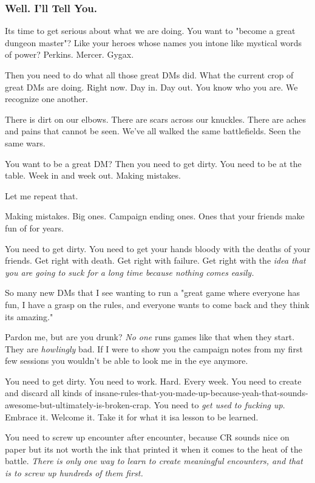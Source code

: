 \subsubsection{Well. I'll Tell You.}
Its time to get serious about what we are doing. You want to "become a great dungeon master"? Like your heroes whose names you intone like mystical words of power? Perkins. Mercer. Gygax.

Then you need to do what all those great DMs did. What the current crop of great DMs are doing. Right now. Day in. Day out. You know who you are. We recognize one another.

There is dirt on our elbows. There are scars across our knuckles. There are aches and pains that cannot be seen. We've all walked the same battlefields. Seen the same wars.

You want to be a great DM? Then you need to get dirty. You need to be at the table. Week in and week out. Making mistakes.

Let me repeat that.

Making mistakes. Big ones. Campaign ending ones. Ones that your friends make fun of for years.

You need to get dirty. You need to get your hands bloody with the deaths of your friends. Get right with death. Get right with failure. Get right with the \emph{idea that you are going to suck for a long time because nothing comes easily.}

So many new DMs that I see wanting to run a "great game where everyone has fun, I have a grasp on the rules, and everyone wants to come back and they think its amazing."

Pardon me, but are you drunk? \emph{No one} runs games like that when they start. They are \emph{howlingly} bad. If I were to show you the campaign notes from my first few sessions you wouldn't be able to look me in the eye anymore.

You need to get dirty. You need to work. Hard. Every week. You need to create and discard all kinds of insane-rules-that-you-made-up-because-yeah-that-sounds-awesome-but-ultimately-is-broken-crap. You need to \emph{get used to fucking up}. Embrace it. Welcome it. Take it for what it is\hbNone a lesson to be learned.

You need to screw up encounter after encounter, because CR sounds nice on paper but its not worth the ink that printed it when it comes to the heat of the battle. \emph{There is only one way to learn to create meaningful encounters, and that is to screw up hundreds of them first.}

